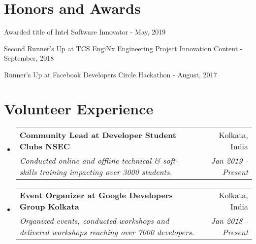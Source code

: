 \documentclass[a4paper,20pt]{article}
\makeatletter
\newcommand{\resumeSubheading}[4]{
  \vspace{-1pt}\item
    \begin{tabular*}{0.97\textwidth}{l@{\extracolsep{\fill}}r}
      \textbf{#1} & #2 \\
      \textit{#3} & \textit{#4} \\
    \end{tabular*}\vspace{-5pt}
}
\newcommand{\resumeSubHeadingListStart}{\begin{itemize}[leftmargin=*]}
\newcommand{\resumeSubHeadingListEnd}{\end{itemize}}
\makeatother
\begin{document}
\section{Honors and Awards}
\begin{description}[font=$\bullet$]
\item {Awarded title of Intel Software Innovator - May, 2019}
\vspace{-5pt}
\item {Second Runner's Up at TCS EngiNx Engineering Project Innovation Content - September, 2018 }
\vspace{-5pt}
\item {Runner's Up at Facebook Developers Circle Hackathon - August, 2017}

\end{description}

\vspace{-5pt}
\section{Volunteer Experience}
  \resumeSubHeadingListStart
	\resumeSubheading
    {Community Lead at Developer Student Clubs NSEC}{Kolkata, India}
    {Conducted online and offline technical \& soft-skills training impacting over 3000 students.}{Jan 2019 - Present}
\vspace{5pt}
    \resumeSubheading
    {Event Organizer at Google Developers Group Kolkata}{Kolkata, India}
    {Organized events, conducted workshops and delivered workshops reaching over 7000 developers.}{Jan 2018 - Present}

\resumeSubHeadingListEnd
\end{document}
